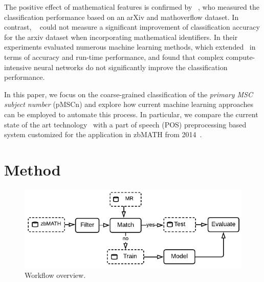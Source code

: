 The positive effect of mathematical features is confirmed by \citeauthor{SuzukiF17}~\cite{SuzukiF17}, who measured the classification performance based on an arXiv and mathoverflow dataset.
In contrast, \citeauthor{Scharpf2020}~\cite{Scharpf2020} could not measure a significant improvement of classification accuracy for the arxiv dataset when incorporating mathematical identifiers.
In their experiments \citeauthor{Scharpf2020} evaluated numerous machine learning methods, which extended~\cite{Evans17,SojkaNALS19} in terms of accuracy and run-time performance, and found that complex compute-intensive neural networks do not significantly improve the classification performance.

In this paper, we focus on the coarse-grained classification of the \emph{primary MSC subject number} (pMSCn) and explore how current machine learning approaches can be employed to automate this process.
In particular, we compare the current state of the art technology~\cite{Scharpf2020} with a part of speech (POS) preprocessing based system customized for the application in zbMATH from 2014~\cite{SchonebergS14}.
\\

\noindent\hspace{-.01\textwidth}

\section{Method}\label{sec:method}
\begin{figure}[t]
    \centering
    \includegraphics[width=\textwidth]{AutoMSC.pdf}
    \caption{Workflow overview.}\label{fgWorkflow}
\end{figure}


